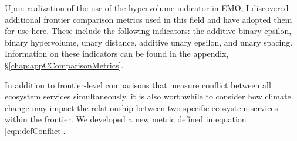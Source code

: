 Upon realization of the use of the hypervolume indicator in EMO, I discovered additional frontier comparison metrics used in this field and have adopted them for use here. These include the following indicators: the additive binary epsilon, binary hypervolume, unary distance, additive unary epsilon, and unary spacing. Information on these indicators can be found in the appendix, \S \ref{chap:appCComparisonMetrics}.

In addition to frontier-level comparisons that measure conflict between all ecosystem services simultaneously, it is also worthwhile to consider how climate change may impact the relationship between two specific ecosystem services within the frontier. We developed a new metric defined in equation \eqref{eqn:defConflict}.